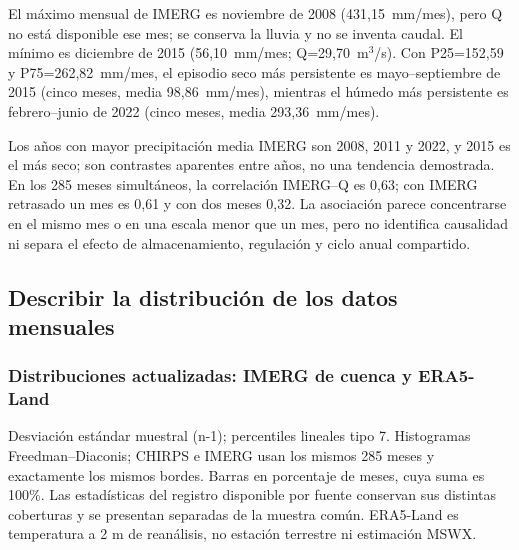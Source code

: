 \documentclass[10pt,a4paper]{article}
\begin{document}
El máximo mensual de IMERG es noviembre de 2008 (431,15~mm/mes), pero Q no está disponible ese mes; se conserva la lluvia y no se inventa caudal. El mínimo es diciembre de 2015 (56,10~mm/mes; Q=29,70~m$^3$/s). Con P25=152,59 y P75=262,82~mm/mes, el episodio seco más persistente es mayo--septiembre de 2015 (cinco meses, media 98,86~mm/mes), mientras el húmedo más persistente es febrero--junio de 2022 (cinco meses, media 293,36~mm/mes).

Los años con mayor precipitación media IMERG son 2008, 2011 y 2022, y 2015 es el más seco; son contrastes aparentes entre años, no una tendencia demostrada. En los 285 meses simultáneos, la correlación IMERG--Q es 0,63; con IMERG retrasado un mes es 0,61 y con dos meses 0,32. La asociación parece concentrarse en el mismo mes o en una escala menor que un mes, pero no identifica causalidad ni separa el efecto de almacenamiento, regulación y ciclo anual compartido.



\subsection{Describir la distribución de los datos mensuales}
\subsubsection*{Distribuciones actualizadas: IMERG de cuenca y ERA5-Land}
Desviación estándar muestral (n-1); percentiles lineales tipo 7. Histogramas Freedman--Diaconis; CHIRPS e IMERG usan los mismos 285 meses y exactamente los mismos bordes. Barras en porcentaje de meses, cuya suma es 100\%. Las estadísticas del registro disponible por fuente conservan sus distintas coberturas y se presentan separadas de la muestra común. ERA5-Land es temperatura a 2 m de reanálisis, no estación terrestre ni estimación MSWX.
\end{document}
